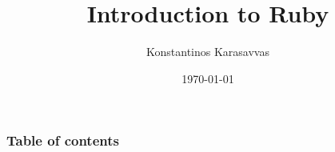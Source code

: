 \documentclass{beamer}
\begin{document}
\title{Introduction to Ruby}
\author{Konstantinos Karasavvas}
\date{\today} 

\begin{frame}
  \titlepage
\end{frame}

\begin{frame}
\setcounter{tocdepth}{1}
\frametitle{Table of contents}
\tableofcontents
\end{frame} 





\end{document}
